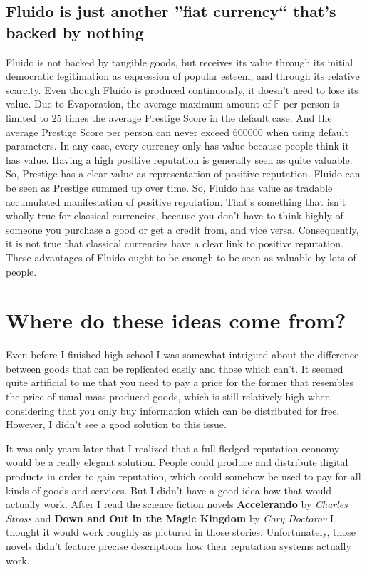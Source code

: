 \documentclass[a4paper,12pt]{scrartcl}
\begin{document}
\subsection{Fluido is just another ''fiat currency`` that's backed by nothing}
Fluido is not backed by tangible goods, but receives its value through its initial democratic legitimation as expression of popular esteem, and through its relative scarcity. Even though Fluido is produced continuously, it doesn't need to lose its value. Due to Evaporation, the average maximum amount of $\mathbb{F}$ per person is limited to $25$ times the average Prestige Score in the default case. And the average Prestige Score per person can never exceed $600 000$ when using default parameters.
In any case, every currency only has value because people think it has value. Having a high positive reputation is generally seen as quite valuable. So, Prestige has a clear value as representation of positive reputation. Fluido can be seen as Prestige summed up over time. So, Fluido has value as tradable accumulated manifestation of positive reputation. That's something that isn't wholly true for classical currencies, because you don't have to think highly of someone you purchase a good or get a credit from, and vice versa. Consequently, it is not true that classical currencies have a clear link to positive reputation.
These advantages of Fluido ought to be enough to be seen as valuable by lots of people.

\section{Where do these ideas come from?}

Even before I finished high school I was somewhat intrigued about the difference between goods that can be replicated easily and those which can’t. It seemed quite artificial to me that you need to pay a price for the former that resembles the price of usual mass-produced goods, which is still relatively high when considering that you only buy information which can be distributed for free. However, I didn’t see a good solution to this issue.

It was only years later that I realized that a full-fledged reputation economy would be a really elegant solution. People could produce and distribute digital products in order to gain reputation, which could somehow be used to pay for all kinds of goods and services. But I didn’t have a good idea how that would actually work. After I read the science fiction novels \textbf{Accelerando} by \textit{Charles Stross} and \textbf{Down and Out in the Magic Kingdom} by \textit{Cory Doctorov} I thought it would work roughly as pictured in those stories. Unfortunately, those novels didn’t feature precise descriptions how their reputation systems actually work.
\end{document}
